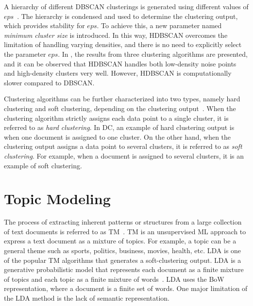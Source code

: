 \begin{description}
	
	
	A hierarchy of different \ac{DBSCAN} clusterings is generated using different values of $eps$~\cite{mcinnes2017accelerated}. The hierarchy is condensed and used to determine the clustering output, which provides stability for $eps$. To achieve this, a new parameter named \emph{minimum cluster size} is introduced. In this way, \ac{HDBSCAN} overcomes the limitation of handling varying densities, and there is no need to explicitly select the parameter $eps$. In , the results from three clustering algorithms are presented, and it can be observed that \ac{HDBSCAN} handles both low-density noise points and high-density clusters very well. However, \ac{HDBSCAN} is computationally slower compared to \ac{DBSCAN}.

	
	

	
\end{description} 


Clustering algorithms can be further characterized into two types, namely hard clustering and soft clustering, depending on the clustering output~\cite{de2012document}. When the clustering algorithm strictly assigns each data point to a single cluster, it is referred to as \emph{hard clustering}. In \ac{DC}, an example of hard clustering output is when one document is assigned to one cluster. On the other hand, when the clustering output assigns a data point to several clusters, it is referred to as \emph{soft clustering}. For example, when a document is assigned to several clusters, it is an example of soft clustering.


\section{Topic Modeling}

The process of extracting inherent patterns or structures from a large collection of text documents is referred to as \ac{TM}~\cite{angelov2020top2vec}. \ac{TM} is an unsupervised \ac{ML} approach to express a text document as a mixture of topics. For example, a topic can be a general theme such as sports, politics, business, movies, health, etc. \ac{LDA} is one of the popular \ac{TM} algorithms that generates a soft-clustering output. \ac{LDA} is a generative probabilistic model that represents each document as a finite mixture of topics and each topic as a finite mixture of words~\cite{blei2003latent, angelov2020top2vec}. \ac{LDA} uses the \ac{BoW} representation, where a document is a finite set of words. One major limitation of the \ac{LDA} method is the lack of semantic representation.

